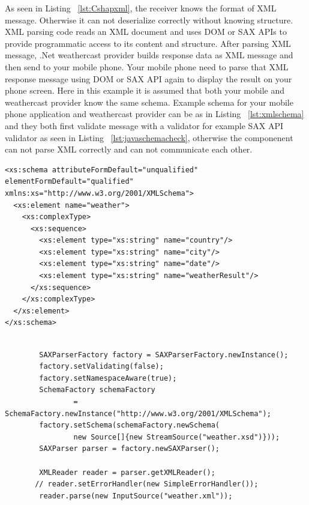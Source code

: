 As seen in Listing ~\ref{lst:Cshapxml}, the receiver knows the format of XML message. Otherwise it can not deserialize correctly without knowing structure. XML parsing code reads an XML document and uses DOM or SAX APIs\citep{thesis:arch20} to provide programmatic access to its content and structure. After parsing XML message, .Net weathercast provider builds response data as XML message and then send to your mobile phone. Your mobile phone need to parse that XML response message using DOM or SAX API again to display the result on your phone screen. Here in this example it is assumed that both your mobile and weathercast provider know the same schema. Example schema for your mobile phone application and weathercast provider can be as in Listing ~\ref{lst:xmlschema}  and they both first validate message with a validator for example  SAX API validator\citep{thesis:arch10} as seen in Listing ~\ref{lst:javaschemacheck}, otherwise the componenent can not parse XML correctly and can not communicate each other.

\begin{lstlisting}[caption=Example schema for Weather XML file, label=lst:xmlschema]
<xs:schema attributeFormDefault="unqualified" elementFormDefault="qualified" xmlns:xs="http://www.w3.org/2001/XMLSchema">
  <xs:element name="weather">
    <xs:complexType>
      <xs:sequence>
        <xs:element type="xs:string" name="country"/>
        <xs:element type="xs:string" name="city"/>
        <xs:element type="xs:string" name="date"/>
        <xs:element type="xs:string" name="weatherResult"/>
      </xs:sequence>
    </xs:complexType>
  </xs:element>
</xs:schema>
\end{lstlisting}


\begin{lstlisting}[caption=Example XML message to send weathercast provider, label=lst:javaschemacheck]

		SAXParserFactory factory = SAXParserFactory.newInstance();
        factory.setValidating(false);
        factory.setNamespaceAware(true);
        SchemaFactory schemaFactory
                = SchemaFactory.newInstance("http://www.w3.org/2001/XMLSchema");
        factory.setSchema(schemaFactory.newSchema(
                new Source[]{new StreamSource("weather.xsd")}));
        SAXParser parser = factory.newSAXParser();

        XMLReader reader = parser.getXMLReader();
       // reader.setErrorHandler(new SimpleErrorHandler());
        reader.parse(new InputSource("weather.xml"));

\end{lstlisting}

